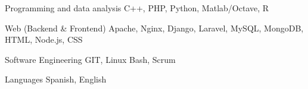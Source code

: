 

\begin{cvskills}

  \cvskill
    {Programming and data analysis} %
    {C++, PHP, Python, Matlab/Octave, R}

  \cvskill
    {Web (Backend \& Frontend)} %
    {Apache, Nginx, Django, Laravel, MySQL, MongoDB, HTML, Node.js, CSS} %

  \cvskill
    {Software Engineering} %
    {GIT, Linux Bash, Scrum} %

  \cvskill
    {Languages} %
    {Spanish, English} %

\end{cvskills}
